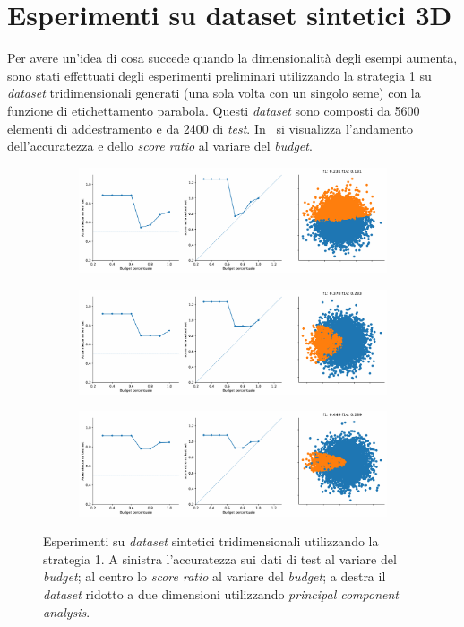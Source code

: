 \section{Esperimenti su dataset sintetici 3D}\label{sec:exp:synth_3d}
Per avere un'idea di cosa succede quando la dimensionalità degli esempi aumenta, sono stati effettuati degli esperimenti preliminari utilizzando la strategia 1 su \emph{dataset} tridimensionali generati (una sola volta con un singolo seme) con la funzione di etichettamento parabola.
Questi \emph{dataset} sono composti da 5600 elementi di addestramento e da 2400 di \emph{test}.
In~ si visualizza l'andamento dell'accuratezza e dello \emph{score ratio} al variare del \emph{budget}.
\begin{figure}
    \begin{subfigure}{\textwidth}
        \centering
        \includegraphics[width=\textwidth]{img/3d/1.pdf}
    \end{subfigure}%
    \hfill
    \begin{subfigure}{\textwidth}
        \centering
        \includegraphics[width=\textwidth]{img/3d/2.pdf}
    \end{subfigure}%
    \hfill
    \begin{subfigure}{\textwidth}
        \centering
        \includegraphics[width=\textwidth]{img/3d/3.pdf}
    \end{subfigure}%
\caption{Esperimenti su \emph{dataset} sintetici tridimensionali utilizzando la strategia 1. A sinistra l'accuratezza sui dati di test al variare del \emph{budget}; al centro lo \emph{score ratio} al variare del \emph{budget}; a destra il \emph{dataset} ridotto a due dimensioni utilizzando \emph{principal component analysis}.}
\label{fig:3d_exp}
\end{figure}
